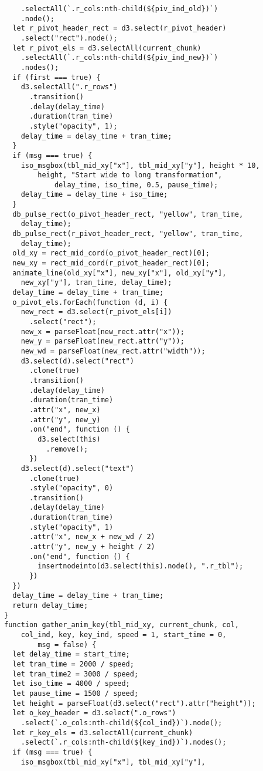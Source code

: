 \begin{lstlisting}
    .selectAll(`.r_cols:nth-child(${piv_ind_old})`)
    .node();
  let r_pivot_header_rect = d3.select(r_pivot_header)
    .select("rect").node();
  let r_pivot_els = d3.selectAll(current_chunk)
    .selectAll(`.r_cols:nth-child(${piv_ind_new})`)
    .nodes();
  if (first === true) {
    d3.selectAll(".r_rows")
      .transition()
      .delay(delay_time)
      .duration(tran_time)
      .style("opacity", 1);
    delay_time = delay_time + tran_time;
  }
  if (msg === true) {
    iso_msgbox(tbl_mid_xy["x"], tbl_mid_xy["y"], height * 10, 
        height, "Start wide to long transformation", 
            delay_time, iso_time, 0.5, pause_time);
    delay_time = delay_time + iso_time;
  }
  db_pulse_rect(o_pivot_header_rect, "yellow", tran_time, 
    delay_time);
  db_pulse_rect(r_pivot_header_rect, "yellow", tran_time, 
    delay_time);
  old_xy = rect_mid_cord(o_pivot_header_rect)[0];
  new_xy = rect_mid_cord(r_pivot_header_rect)[0];
  animate_line(old_xy["x"], new_xy["x"], old_xy["y"], 
    new_xy["y"], tran_time, delay_time);
  delay_time = delay_time + tran_time;
  o_pivot_els.forEach(function (d, i) {
    new_rect = d3.select(r_pivot_els[i])
      .select("rect");
    new_x = parseFloat(new_rect.attr("x"));
    new_y = parseFloat(new_rect.attr("y"));
    new_wd = parseFloat(new_rect.attr("width"));
    d3.select(d).select("rect")
      .clone(true)
      .transition()
      .delay(delay_time)
      .duration(tran_time)
      .attr("x", new_x)
      .attr("y", new_y)
      .on("end", function () {
        d3.select(this)
          .remove();
      })
    d3.select(d).select("text")
      .clone(true)
      .style("opacity", 0)
      .transition()
      .delay(delay_time)
      .duration(tran_time)
      .style("opacity", 1)
      .attr("x", new_x + new_wd / 2)
      .attr("y", new_y + height / 2)
      .on("end", function () {
        insertnodeinto(d3.select(this).node(), ".r_tbl");
      })
  })
  delay_time = delay_time + tran_time;
  return delay_time;
}
function gather_anim_key(tbl_mid_xy, current_chunk, col, 
    col_ind, key, key_ind, speed = 1, start_time = 0, 
        msg = false) {
  let delay_time = start_time;
  let tran_time = 2000 / speed;
  let tran_time2 = 3000 / speed;
  let iso_time = 4000 / speed;
  let pause_time = 1500 / speed;
  let height = parseFloat(d3.select("rect").attr("height"));
  let o_key_header = d3.select(".o_rows")
    .select(`.o_cols:nth-child(${col_ind})`).node();
  let r_key_els = d3.selectAll(current_chunk)
    .select(`.r_cols:nth-child(${key_ind})`).nodes();
  if (msg === true) {
    iso_msgbox(tbl_mid_xy["x"], tbl_mid_xy["y"], 

\end{lstlisting}

